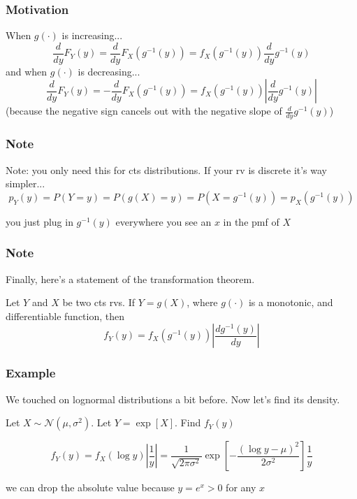 \documentclass{beamer}
\begin{document}

\begin{frame}
\frametitle{Motivation}

When $g(\cdot)$ is increasing...
\[
\frac{d}{dy}F_Y(y) = \frac{d}{dy}F_X(g^{-1}(y)) = f_X(g^{-1}(y))\frac{d}{dy}g^{-1}(y)
\]
and when $g(\cdot)$ is decreasing...
\[
\frac{d}{dy}F_Y(y) = - \frac{d}{dy}F_X(g^{-1}(y)) = f_X(g^{-1}(y)) \left| \frac{d}{dy}g^{-1}(y) \right|
\]
(because the negative sign cancels out with the negative slope of $\frac{d}{dy}g^{-1}(y)$)

\end{frame}


\begin{frame}
\frametitle{Note}

Note: you only need this for cts distributions. If your rv is discrete it's way simpler...
\[
p_Y(y) = P(Y = y) = P(g(X) = y) = P(X = g^{-1}(y)) = p_X(g^{-1}(y))
\]

you just plug in $g^{-1}(y)$ everywhere you see an $x$ in the pmf of $X$

\end{frame}


\begin{frame}
\frametitle{Note}

Finally, here's a statement of the transformation theorem. 
\newline

\begin{theorem}
Let $Y$ and $X$ be two cts rvs. If $Y = g(X)$, where $g(\cdot)$ is a monotonic, and differentiable function, then
\[
f_Y(y) = f_X(g^{-1}(y)) \left| \frac{dg^{-1}(y)}{dy} \right|
\]
\end{theorem}

\end{frame}


\begin{frame}
\frametitle{Example}

We touched on lognormal distributions a bit before. Now let's find its density.
\newline

Let $X \sim \mathcal{N}(\mu, \sigma^2)$. Let $Y = \exp[ X]$. Find $f_Y(y)$
\pause
\newline

\[
f_Y(y) = f_X(\log y) \left| \frac{1}{y} \right| = \frac{1}{\sqrt{2 \pi \sigma^2}} \exp \left[- \frac{(\log y - \mu)^2}{2 \sigma^2} \right] \frac{1}{y}
\]

we can drop the absolute value because $y = e^{x} > 0$ for any $x$
\end{frame}
\end{document}
